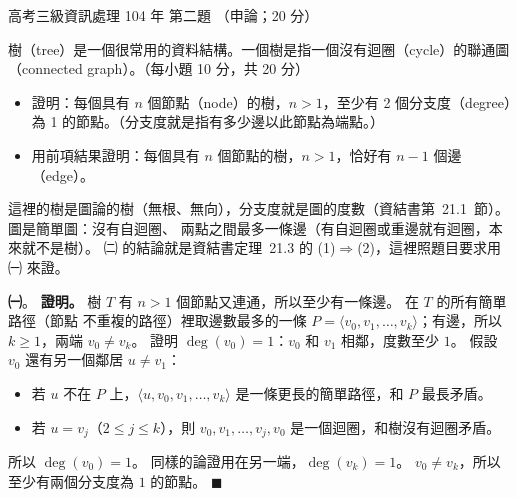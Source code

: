 \begin{pastexam}[label={px:gk3-104-ds-02}]{高考三級資訊處理 104 年 第二題}
（申論；20 分）

樹（tree）是一個很常用的資料結構。一個樹是指一個沒有迴圈（cycle）的聯通圖（connected graph）。（每小題 10 分，共 20 分）
\begin{itemize}[leftmargin=2.2em]
\item[㈠] 證明：每個具有 $n$ 個節點（node）的樹，$n>1$，至少有 2 個分支度（degree）為 1 的節點。（分支度就是指有多少邊以此節點為端點。）
\item[㈡] 用前項結果證明：每個具有 $n$ 個節點的樹，$n>1$，恰好有 $n-1$ 個邊（edge）。
\end{itemize}
\end{pastexam}

\begin{pastsoln}
這裡的樹是圖論的樹（無根、無向），分支度就是圖的度數（資結書第~21.1~節）。 圖是簡單圖：沒有自迴圈、
兩點之間最多一條邊（有自迴圈或重邊就有迴圈，本來就不是樹）。 ㈡ 的結論就是資結書定理~21.3 的
(1)$\Rightarrow$(2)，這裡照題目要求用 ㈠ 來證。

\textbf{㈠}。 \textbf{證明。} 樹 $T$ 有 $n > 1$ 個節點又連通，所以至少有一條邊。 在 $T$ 的所有簡單路徑（節點
不重複的路徑）裡取邊數最多的一條 $P = \langle v_0, v_1, \ldots, v_k \rangle$；有邊，所以 $k \ge 1$，兩端
$v_0 \ne v_k$。 證明 $\deg(v_0) = 1$：$v_0$ 和 $v_1$ 相鄰，度數至少 $1$。 假設 $v_0$ 還有另一個鄰居
$u \ne v_1$：
\begin{itemize}
\item 若 $u$ 不在 $P$ 上，$\langle u, v_0, v_1, \ldots, v_k \rangle$ 是一條更長的簡單路徑，和 $P$ 最長矛盾。
\item 若 $u = v_j$（$2 \le j \le k$），則 $v_0, v_1, \ldots, v_j, v_0$ 是一個迴圈，和樹沒有迴圈矛盾。
\end{itemize}
所以 $\deg(v_0) = 1$。 同樣的論證用在另一端，$\deg(v_k) = 1$。 $v_0 \ne v_k$，所以至少有兩個分支度為 $1$
的節點。 \hfill$\blacksquare$


\end{pastsoln}

